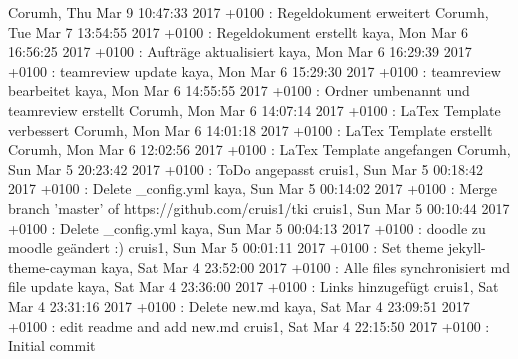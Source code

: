 Corumh, Thu Mar 9 10:47:33 2017 +0100 : Regeldokument erweitert
Corumh, Tue Mar 7 13:54:55 2017 +0100 : Regeldokument erstellt
kaya, Mon Mar 6 16:56:25 2017 +0100 : Aufträge aktualisiert
kaya, Mon Mar 6 16:29:39 2017 +0100 : teamreview update
kaya, Mon Mar 6 15:29:30 2017 +0100 : teamreview bearbeitet
kaya, Mon Mar 6 14:55:55 2017 +0100 : Ordner umbenannt und teamreview erstellt
Corumh, Mon Mar 6 14:07:14 2017 +0100 : LaTex Template verbessert
Corumh, Mon Mar 6 14:01:18 2017 +0100 : LaTex Template erstellt
Corumh, Mon Mar 6 12:02:56 2017 +0100 : LaTex Template angefangen
Corumh, Sun Mar 5 20:23:42 2017 +0100 : ToDo angepasst
cruis1, Sun Mar 5 00:18:42 2017 +0100 : Delete _config.yml
kaya, Sun Mar 5 00:14:02 2017 +0100 : Merge branch 'master' of https://github.com/cruis1/tki
cruis1, Sun Mar 5 00:10:44 2017 +0100 : Delete _config.yml
kaya, Sun Mar 5 00:04:13 2017 +0100 : doodle zu moodle geändert :)
cruis1, Sun Mar 5 00:01:11 2017 +0100 : Set theme jekyll-theme-cayman
kaya, Sat Mar 4 23:52:00 2017 +0100 : Alle files synchronisiert md file update
kaya, Sat Mar 4 23:36:00 2017 +0100 : Links hinzugefügt
cruis1, Sat Mar 4 23:31:16 2017 +0100 : Delete new.md
kaya, Sat Mar 4 23:09:51 2017 +0100 : edit readme and add new.md
cruis1, Sat Mar 4 22:15:50 2017 +0100 : Initial commit


